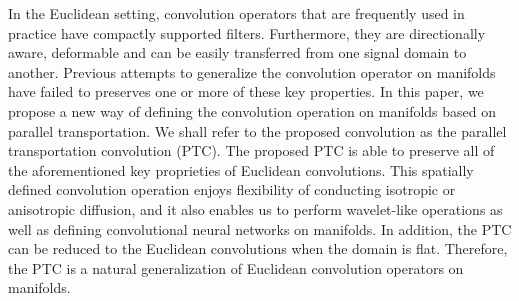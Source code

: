 \documentclass[10pt,twocolumn,letterpaper]{article}
\begin{document}
\begin{table*}[htp]
\begin{center}
\vspace{-0.5cm}
\begin{center}
\end{center}
\label{CompTable}
\caption{Comparison on different generalizations of convolutional operator on general manifolds.}
\end{center}
\end{table*}

In the Euclidean setting, convolution operators that are frequently used in practice have compactly supported filters. Furthermore, they are directionally aware, deformable and can be easily transferred from one signal domain to another. Previous attempts to generalize the convolution operator on manifolds have failed to preserves one or more of these key properties. In this paper, we propose a new way of defining the convolution operation on manifolds based on parallel transportation. We shall refer to the proposed convolution as the parallel transportation convolution (PTC). The proposed PTC is able to preserve all of the aforementioned key proprieties of Euclidean convolutions. This spatially defined convolution operation enjoys flexibility of conducting isotropic or anisotropic diffusion, and it also enables us to perform wavelet-like operations as well as defining convolutional neural networks on manifolds. In addition, the PTC can be reduced to the Euclidean convolutions when the domain is flat. Therefore, the PTC is a natural generalization of Euclidean convolution operators on manifolds.
\end{document}
